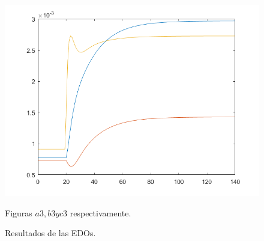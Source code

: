 \begin{figure}[h!]
\includegraphics[scale=0.3]{../c3.png}
\caption{Figuras $a3, b3 y c3$ respectivamente.}
\caption{Resultados de las EDOs.}
\label{circnpnmaxout}
\end{figure}

